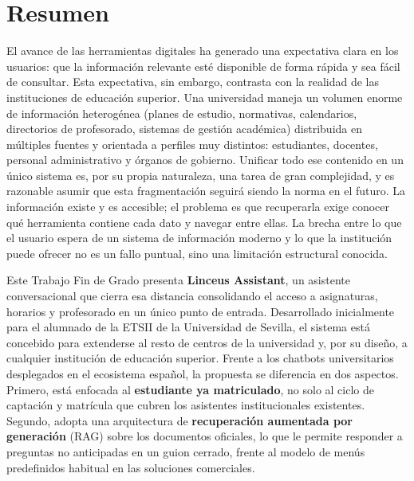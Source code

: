 
\titlespacing*{\chapter}{0pt}{-30pt}{15pt}
\chapter*{Resumen}\label{cap:resumen}
\titlespacing*{\chapter}{0pt}{30pt}{20pt}

El avance de las herramientas digitales ha generado una expectativa clara en los usuarios: que la información relevante esté disponible de forma rápida y sea fácil de consultar. Esta expectativa, sin embargo, contrasta con la realidad de las instituciones de educación superior. Una universidad maneja un volumen enorme de información heterogénea (planes de estudio, normativas, calendarios, directorios de profesorado, sistemas de gestión académica) distribuida en múltiples fuentes y orientada a perfiles muy distintos: estudiantes, docentes, personal administrativo y órganos de gobierno. Unificar todo ese contenido en un único sistema es, por su propia naturaleza, una tarea de gran complejidad, y es razonable asumir que esta fragmentación seguirá siendo la norma en el futuro. La información existe y es accesible; el problema es que recuperarla exige conocer qué herramienta contiene cada dato y navegar entre ellas. La brecha entre lo que el usuario espera de un sistema de información moderno y lo que la institución puede ofrecer no es un fallo puntual, sino una limitación estructural conocida.

Este Trabajo Fin de Grado presenta \textbf{Linceus Assistant}, un asistente conversacional que cierra esa distancia consolidando el acceso a asignaturas, horarios y profesorado en un único punto de entrada. Desarrollado inicialmente para el alumnado de la ETSII de la Universidad de Sevilla, el sistema está concebido para extenderse al resto de centros de la universidad y, por su diseño, a cualquier institución de educación superior. Frente a los chatbots universitarios desplegados en el ecosistema español, la propuesta se diferencia en dos aspectos. Primero, está enfocada al \textbf{estudiante ya matriculado}, no solo al ciclo de captación y matrícula que cubren los asistentes institucionales existentes. Segundo, adopta una arquitectura de \textbf{recuperación aumentada por generación} (RAG) sobre los documentos oficiales, lo que le permite responder a preguntas no anticipadas en un guion cerrado, frente al modelo de menús predefinidos habitual en las soluciones comerciales.

